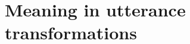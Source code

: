 \documentclass[english,]{article}
\begin{document}


\section{Meaning in utterance transformations}
\label{sec:meaning}
\end{document}

